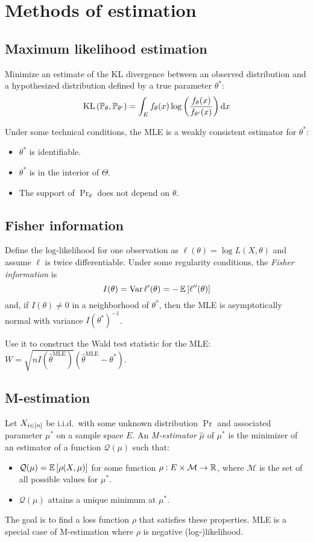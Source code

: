 \documentclass[a4paper]{article}
\begin{document}
\section{Methods of estimation}
    \subsection{Maximum likelihood estimation}
        Minimize an estimate of the KL divergence between an observed distribution and a hypothesized distribution defined by a true parameter $\theta^\ast$:
        \[
            \KL{\left(\Pr_\theta, \Pr_{\theta'}\right)} = \int_E f_\theta(x) \log{\left(\frac{f_\theta(x)}{f_{\theta'}(x)}\right)} \difl x
        \]

        Under some technical conditions, the MLE is a weakly consistent estimator for $\theta^\ast$:
        \begin{itemize}
            \item $\theta^\ast$ is identifiable.
            \item $\theta^\ast$ is in the interior of $\Theta$.
            \item The support of $\Pr_\theta$ does not depend on $\theta$.
        \end{itemize}

    \subsection{Fisher information}
        Define the log-likelihood for one observation as $\ell(\theta) = \log{L(X, \theta)}$ and assume $\ell$ is twice differentiable.
        Under some regularity conditions, the \emph{Fisher information} is
        \[
            I(\theta) = \operatorname{Var}{\ell'(\theta)} = -\operatorname{\mathbb{E}}{[\ell''(\theta)]}
        \]
        and, if $I(\theta) \neq 0$ in a neighborhood of $\theta^\ast$, then the MLE is asymptotically normal with variance $I(\theta^\ast)^{-1}$.

        Use it to construct the Wald test statistic for the MLE: $W = \sqrt{n I(\hat{\theta}^\textrm{MLE})} (\hat{\theta}^\textrm{MLE} - \theta^\ast)$.

    \subsection{M-estimation}
        Let $X_{i \in \left[n\right]}$ be i.i.d.\ with some unknown distribution $\Pr$ and associated parameter $\mu^\ast$ on a sample space $E$.
        An \emph{M-estimator} $\hat{\mu}$ of $\mu^\ast$ is the minimizer of an estimator of a function $\mathcal{Q}(\mu)$ such that:
        \begin{itemize}
            \item $\mathcal{Q}(\mu) = \operatorname{\mathbb{E}}{[\rho(X, \mu)]}$ for some function $\rho: E \times \mathcal{M} \rightarrow \mathbb{R}$, where $\mathcal{M}$ is the set of all possible values for $\mu^\ast$.
            \item $\mathcal{Q}(\mu)$ attains a unique minimum at $\mu^\ast$.
        \end{itemize}
        The goal is to find a loss function $\rho$ that satisfies these properties.
        MLE is a special case of M-estimation where $\rho$ is negative (log-)likelihood.
\end{document}
